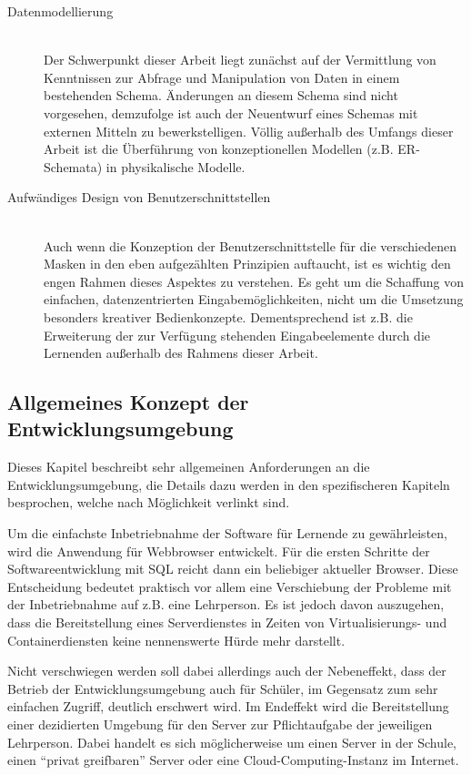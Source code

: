 \begin{description}
\item[Datenmodellierung] \hfill \\
  Der Schwerpunkt dieser Arbeit liegt zunächst auf der Vermittlung von Kenntnissen zur Abfrage und Manipulation von Daten in einem bestehenden Schema. Änderungen an diesem Schema sind nicht vorgesehen, demzufolge ist auch der Neuentwurf eines Schemas mit externen Mitteln zu bewerkstelligen. Völlig außerhalb des Umfangs dieser Arbeit ist die Überführung von konzeptionellen Modellen (z.B. ER-Schemata) in physikalische Modelle.
\item[Aufwändiges Design von Benutzerschnittstellen] \hfill \\
  Auch wenn die Konzeption der Benutzerschnittstelle für die verschiedenen Masken in den eben aufgezählten Prinzipien auftaucht, ist es wichtig den engen Rahmen dieses Aspektes zu verstehen. Es geht um die Schaffung von einfachen, datenzentrierten Eingabemöglichkeiten, nicht um die Umsetzung besonders kreativer Bedienkonzepte. Dementsprechend ist z.B. die Erweiterung der zur Verfügung stehenden Eingabeelemente durch die Lernenden außerhalb des Rahmens dieser Arbeit.
\end{description}

\subsection{Allgemeines Konzept der Entwicklungsumgebung}
\label{sec:design-general-concept}

Dieses Kapitel beschreibt sehr allgemeinen Anforderungen an die Entwicklungsumgebung, die Details dazu werden in den spezifischeren Kapiteln besprochen, welche nach Möglichkeit verlinkt sind.

Um die einfachste Inbetriebnahme der Software für Lernende zu gewährleisten, wird die Anwendung für Webbrowser entwickelt. Für die ersten Schritte der Softwareentwicklung mit SQL reicht dann ein beliebiger aktueller Browser. Diese Entscheidung bedeutet praktisch vor allem eine Verschiebung der Probleme mit der Inbetriebnahme auf z.B. eine Lehrperson. Es ist jedoch davon auszugehen, dass die Bereitstellung eines Serverdienstes in Zeiten von Virtualisierungs- und Containerdiensten keine nennenswerte Hürde mehr darstellt.

Nicht verschwiegen werden soll dabei allerdings auch der Nebeneffekt, dass der Betrieb der Entwicklungsumgebung auch für Schüler, im Gegensatz zum sehr einfachen Zugriff, deutlich erschwert wird. Im Endeffekt wird die Bereitstellung einer dezidierten Umgebung für den Server zur Pflichtaufgabe der jeweiligen Lehrperson. Dabei handelt es sich möglicherweise um einen Server in der Schule, einen ``privat greifbaren'' Server oder eine Cloud-Computing-Instanz im Internet.

